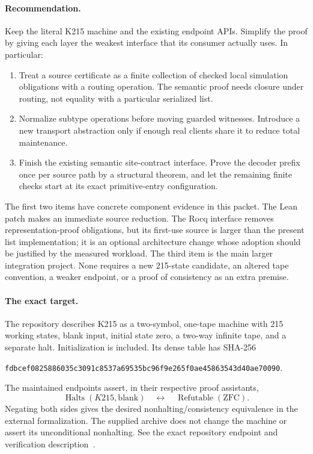 \documentclass[11pt]{article}
\theoremstyle{remark}\newtheorem{remark}[theorem]{Remark}
\newcommand{\halts}{\operatorname{Halts}}
\begin{document}
\paragraph{Recommendation.}
Keep the literal K215 machine and the existing endpoint APIs. Simplify the proof by giving each layer the weakest interface that its consumer actually uses. In particular:
\begin{enumerate}
\item Treat a source certificate as a finite collection of checked local simulation obligations with a routing operation. The semantic proof needs closure under routing, not equality with a particular serialized list.
\item Normalize subtype operations before moving guarded witnesses. Introduce a new transport abstraction only if enough real clients share it to reduce total maintenance.
\item Finish the existing semantic site-contract interface. Prove the decoder prefix once per source path by a structural theorem, and let the remaining finite checks start at its exact primitive-entry configuration.
\end{enumerate}
The first two items have concrete component evidence in this packet. The Lean patch makes an immediate source reduction. The Rocq interface removes representation-proof obligations, but its first-use source is larger than the present list implementation; it is an optional architecture change whose adoption should be justified by the measured workload. The third item is the main larger integration project. None requires a new 215-state candidate, an altered tape convention, a weaker endpoint, or a proof of consistency as an extra premise.

\paragraph{The exact target.}
The repository describes K215 as a two-symbol, one-tape machine with 215 working states, blank input, initial state zero, a two-way infinite tape, and a separate halt. Initialization is included. Its dense table has SHA-256
\begin{center}\small\texttt{fdbcef0825886035c3091c8537a69535bc96f9e265f0ae45863543d40ae70090}.\end{center}
The maintained endpoints assert, in their respective proof assistants,
\[
  \halts(K215,\mathrm{blank})\quad\longleftrightarrow\quad
  \operatorname{Refutable}(\mathrm{ZFC}).
\]
Negating both sides gives the desired nonhalting/consistency equivalence in the external formalization. The supplied archive does not change the machine or assert its unconditional nonhalting. See the exact repository endpoint and verification description~\cite{endpoint,verification}.
\end{document}
